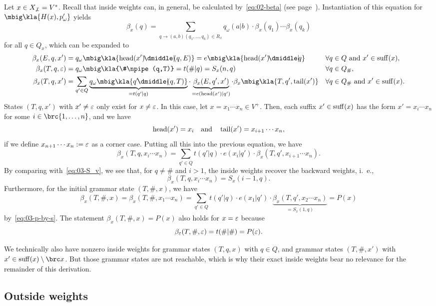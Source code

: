 Let $x\in X_{\not\bot}=V^*$. Recall that inside weights can, in general, be
calculated by~\eqref{eq:02-beta} (see page~\pageref{eq:02-beta}).
Instantiation of this equation for $\mbig\kla{H(x),p_\omega'}$ yields
\[
 \beta_x(q) = \sum_{q\to(a,b)(q_1,\ldots,q_k)\in R_x} q_\omega(a|b) \cdot \beta_x(q_1) \cdots \beta_x(q_k)
\]
for all $q\in Q_x$, which can be expanded to
\begin{align*}
 \beta_x(E,q,x') &= q_\omega\mbig\kla{\car(x')\npipe(q,E)} = e\mbig\kla{\car(x')\npipe q}
 && \forall q\in Q \text{ and } x'\in\suff(x), \\
 \beta_x(T,q,\eps) &= q_\omega\mbig\kla{\#\npipe(q,T)} = t(\#|q) = S_x(n,q)
 && \forall q\in Q_\#, \\
 \beta_x(T,q,x') &= \sum_{q'\in Q} \underbrace{q_\omega\mbig\kla{q'\npipe(q,T)}}_{=t(q'|q)} \cdot \underbrace{\beta_x(E,q',x')}_{=e(\car(x')|q')} \cdot \beta_x\mbig\kla{T,q',\cdr(x')}
 && \forall q\in Q_\# \text{ and } x'\in\suff(x).
\end{align*}
States $(T,q,x')$ with $x'\neq\varepsilon$ only exist for $x\neq\varepsilon$. In this
case, let $x=x_1\cdots x_n\in V^+$. Then, each suffix $x'\in\operatorname{suff}(x)$ has the
form $x' = x_i\cdots x_n$ for some $i\in\brc{1,\ldots,n}$, and we have
\[
 \operatorname{head}(x') = x_i
 \quad\text{and}\quad
 \operatorname{tail}(x') = x_{i+1} \cdots x_n,
\]
if we define $x_{n+1}\cdots x_n := \varepsilon$ as a corner case. Putting all this into
the previous equation, we have
\[
 \beta_x(T,q,x_i\cdots x_n) = \sum_{q'\in Q} t(q'|q) \cdot e(x_i|q') \cdot \beta_x(T,q',x_{i+1}\cdots x_n).
\]
By comparing with~\eqref{eq:03-S_v}, we see that, for $q\neq\#$ and $i>1$, the inside weights recover the backward weights, i.~e.,
\[
 \beta_x(T,q,x_i\cdots x_n) = S_x(i-1,q).
\]
Furthermore, for the initial grammar state $(T,\#,x)$, we have
\[
 \beta_x(T,\#,x) = \beta_x(T,\#,x_1\cdots x_n) = \sum_{q'\in Q} t(q'|q) \cdot e(x_1|q') \cdot \underbrace{\beta_x(T,q',x_2\cdots x_n)}_{=S_x(1,q)} = P(x)
\]
by~\eqref{eq:03-p-by-s}. The statement $\beta_x(T,\#,x) = P(x)$ also holds for $x=\varepsilon$ because
\label{eq:03-beta-eps}\[
 \beta_\varepsilon(T,\#,\varepsilon) = t(\#|\#) = P(\varepsilon).
\]

We technically also have nonzero inside weights for grammar states $(T,q,x)$
with $q\in Q$, and grammar states $(T,\#,x')$ with $x'\in\suff(x)\setminus\brc
x$. But those grammar states are not reachable, which is why their exact inside
weights bear no relevance for the remainder of this derivation.

\subsection{Outside weights}

